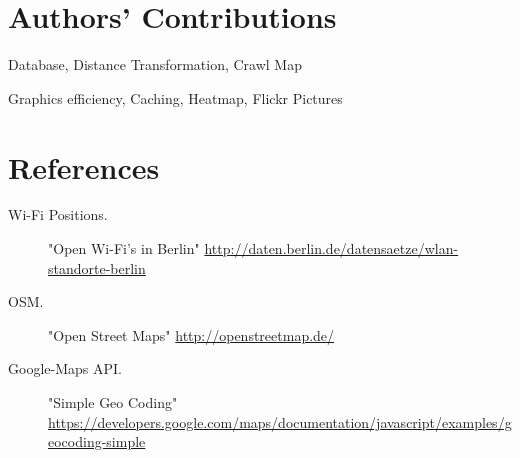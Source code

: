 \section*{Authors' Contributions}

\begin{description}
\setlength{\itemsep}{0pt}
  \item[Andreas Ergenzinger] Database, Distance Transformation, Crawl Map
  \item[Josua Krause] Graphics efficiency, Caching, Heatmap, Flickr Pictures
\end{description}

\section*{References}

\begin{description}
\item[Wi-Fi Positions.] "Open Wi-Fi's in Berlin" 
  \url{http://daten.berlin.de/datensaetze/wlan-standorte-berlin}
\item[OSM.] "Open Street Maps" 
  \url{http://openstreetmap.de/}
\item[Google-Maps API.] "Simple Geo Coding"
  \url{https://developers.google.com/maps/documentation/javascript/examples/geocoding-simple} 
\end{description}
